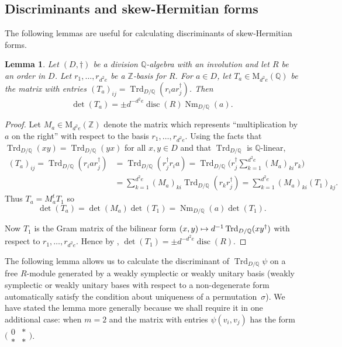\documentclass[JEP,XML,SOM,Unicode,NoFloatCountersInSection]{cedram}
\def\mto{\mathchoice{\longmapsto}{\mapsto}{\mapsto}{\mapsto}}
\newcommand{\bQ}{\mathbb{Q}}
\newcommand{\bZ}{\mathbb{Z}}
\newcommand{\rM}{\mathrm{M}}
\DeclareMathOperator{\disc}{disc}
\DeclareMathOperator{\Nm}{Nm}
\DeclareMathOperator{\Trd}{Trd}
\newcommand{\fullsmallmatrix}[4]{\bigl( \begin{smallmatrix} #1 & #2 \\ #3 & #4 \end{smallmatrix} \bigr)}
\newtheorem{lemma}{Lemma}[section]
\begin{document}
\subsection{Discriminants and skew-Hermitian forms}

The following lemmas are useful for calculating discriminants of skew-Hermitian forms.

\begin{lemma} \label{disc-a-form}
Let $(D,\dag)$ be a division $\bQ$-algebra with an involution and let $R$ be an order in $D$.
Let $r_1, \dotsc, r_{d^2e}$ be a $\bZ$-basis for $R$.
For $a \in D$, let $T_a \in \rM_{d^2e}(\bQ)$ be the matrix with entries $(T_a)_{ij} = \Trd_{D/\bQ}(r_i a r_j^\dag)$.
Then\vspace*{-3pt}
\[
\det(T_a) = \pm d^{-d^2e} \disc(R) \Nm_{D/\bQ}(a).
\]
\end{lemma}

\begin{proof}
Let $M_a \in \rM_{d^2e}(\bZ)$ denote the matrix which represents ``multiplication by $a$ on the right'' with respect to the basis $r_1, \dotsc, r_{d^2e}$.
Using the facts that $\Trd_{D/\bQ}(xy) = \Trd_{D/\bQ}(yx)$ for all $x,y \in D$ and that $\Trd_{D/\bQ}$ is $\bQ$-linear,\vspace*{-3pt}
\begin{align*}
(T_a)_{ij}
= \Trd_{D/\bQ}(r_i a r_j^\dag)
& = \Trd_{D/\bQ}(r_j^\dag r_i a)
= \Trd_{D/\bQ} \bigl( r_j^\dag \textstyle\sum_{k=1}^{d^2e} (M_a)_{ki} r_k \bigr)
\\& = \sum_{k=1}^{d^2e}(M_a)_{ki} \Trd_{D/\bQ}(r_k r_j^\dag)
= \sum_{k=1}^{d^2e} (M_a)_{ki} (T_1)_{kj}.
\end{align*}
Thus $T_a = M_a^t T_1$ so\vspace*{-3pt}
\[
\det(T_a) = \det(M_a) \det(T_1) = \Nm_{D/\bQ}(a) \det(T_1).
\]

Now $T_1$ is the Gram matrix of the bilinear form $(x,y) \mto d^{-1}\Trd_{D/\bQ}(xy^\dag)$ with respect to $r_1, \dotsc, r_{d^2e}$.
Hence by \cite[Lem.\,5.6]{QRTUI}, $\det(T_1) = \pm d^{-d^2e} \disc(R)$.
\end{proof}

The following lemma allows us to calculate the discriminant of $\Trd_{D/\bQ} \psi$ on a free $R$-module generated by a weakly symplectic or weakly unitary basis (weakly symplectic or weakly unitary bases with respect to a non-degenerate form automatically satisfy the condition about uniqueness of a permutation~$\sigma$).
We have stated the lemma more generally because we shall require it in one additional case: when $m=2$ and the matrix with entries $\psi(v_i, v_j)$ has the form $\fullsmallmatrix{0}{*}{*}{*}$.
\end{document}
